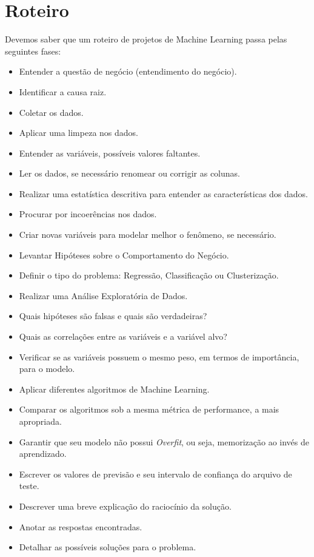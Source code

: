 \section{Roteiro}
Devemos saber que um roteiro de projetos de Machine Learning passa pelas seguintes fases: \vspace{-1em}
\begin{itemize}[noitemsep]
	\item Entender a questão de negócio (entendimento do negócio).
	\item Identificar a causa raiz.
	\item Coletar os dados.
	\item Aplicar uma limpeza nos dados.
	\item Entender as variáveis, possíveis valores faltantes.
	\item Ler os dados, se necessário renomear ou corrigir as colunas.
	\item Realizar uma estatística descritiva para entender as características dos dados.
	\item Procurar por incoerências nos dados.
	\item Criar novas variáveis para modelar melhor o fenômeno, se necessário.
	\item Levantar Hipóteses sobre o Comportamento do Negócio.
	\item Definir o tipo do problema: Regressão, Classificação ou Clusterização.
	\item Realizar uma Análise Exploratória de Dados.
	\item Quais hipóteses são falsas e quais são verdadeiras?
	\item Quais as correlações entre as variáveis e a variável alvo?
	\item Verificar se as variáveis possuem o mesmo peso, em termos de importância, para o modelo.
	\item Aplicar diferentes algoritmos de Machine Learning.
	\item Comparar os algoritmos sob a mesma métrica de performance, a mais apropriada.
	\item Garantir que seu modelo não possui \textit{Overfit}, ou seja, memorização ao invés de aprendizado.
	\item Escrever os valores de previsão e seu intervalo de confiança do arquivo de teste.
	\item Descrever uma breve explicação do raciocínio da solução.
	\item Anotar as respostas encontradas.
	\item Detalhar as possíveis soluções para o problema.
\end{itemize}


